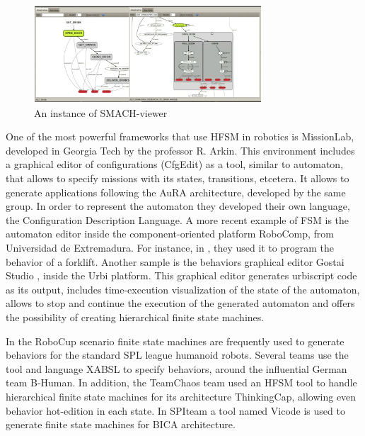 \documentclass[journal,twoside]{JoPhA}
\begin{document}
\begin{figure}[ht!]
\begin{center}
        \includegraphics[width=8.5cm]{figs/smach-viewer.png}
\end{center}
\caption{An instance of SMACH-viewer}
\label{fig:smach}
\end{figure}

One of the most powerful frameworks that use HFSM in robotics is MissionLab, developed in Georgia Tech by the professor R. Arkin. This environment includes a graphical editor of  configurations  (CfgEdit) \cite{mackenzie1998} as a tool, similar to  automaton,  that  allows  to  specify  missions  with  its states, transitions, etcetera. It allows to generate applications following the AuRA architecture, developed by the same group. In order to represent the automaton they developed their own language, the Configuration Description Language. A more recent example of FSM is the automaton editor inside the component-oriented platform RoboComp, from Universidad de Extremadura. For instance, in \cite{cintas2011}, they used it to program the behavior of a forklift. Another sample is the behaviors graphical editor Gostai Studio \cite{gostai2012}, inside the Urbi platform. This graphical editor generates urbiscript code as its output, includes time-execution visualization of the state of the automaton, allows to stop and continue the execution of the generated automaton and offers the possibility of creating hierarchical finite state machines.

In the RoboCup scenario finite state machines are frequently used to generate behaviors for the standard SPL league humanoid robots. Several teams use the tool and language XABSL \cite{lotzsch2004,risler2009} to specify behaviors, around the influential German team B-Human. In addition, the TeamChaos team \cite{herrero2006} used an HFSM tool to handle hierarchical finite state machines for its architecture ThinkingCap, allowing even behavior hot-edition in each state. In SPIteam a tool named Vicode is used to generate finite state machines for BICA architecture.

\end{document}
